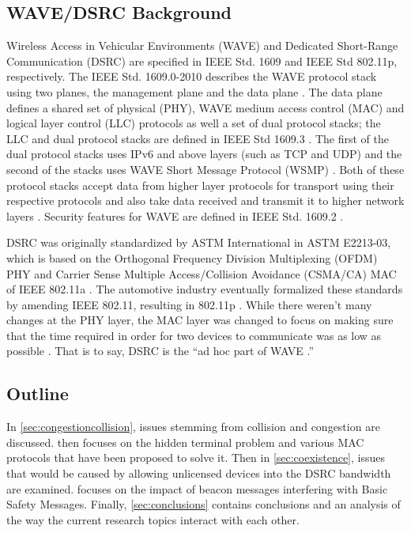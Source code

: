 \documentclass[twoside,conference]{IEEEtran}
\begin{document}
	\subsection{WAVE/DSRC Background}\label{sec:wavedsrcbackground}
		Wireless Access in Vehicular Environments (WAVE) and Dedicated Short-Range Communication (DSRC) are specified in IEEE Std. 1609 and IEEE Std 802.11p, respectively.  The IEEE Std. 1609.0-2010 describes the WAVE protocol stack using two planes, the management plane and the data plane \cite[p. 16]{IEEE2014-Std1609.0-2013}.  The data plane defines a shared set of physical (PHY), WAVE medium access control (MAC) and logical layer control (LLC) protocols as well a set of dual protocol stacks; the LLC and dual protocol stacks are defined in IEEE Std 1609.3 \cite[pp. 16--17]{IEEE2014-Std1609.0-2013}.  The first of the dual protocol stacks uses IPv6 and above layers (such as TCP and UDP) and the second of the stacks uses WAVE Short Message Protocol (WSMP) \cite[p. 9]{IEEE2010-Std1609.3-2010}.  Both of these protocol stacks accept data from higher layer protocols for transport using their respective protocols and also take data received and transmit it to higher network layers \cite[p. 9]{IEEE2010-Std1609.3-2010}.  Security features for WAVE are defined in IEEE Std. 1609.2 \cite{IEEE2013-Std1609.2-2013}.
	
		DSRC was originally standardized by ASTM International in ASTM E2213-03, which is based on the Orthogonal Frequency Division Multiplexing (OFDM) PHY and Carrier Sense Multiple Access/Collision Avoidance (CSMA/CA) MAC of IEEE 802.11a \cite[p. 10]{Lansford2013}.  The automotive industry eventually formalized these standards by amending IEEE 802.11, resulting in 802.11p \cite[p. 10]{Lansford2013}.  While there weren't many changes at the PHY layer, the MAC layer was changed to focus on making sure that the time required in order for two devices to communicate was as low as possible \cite[p. 10]{Lansford2013}\cite{Serageldin2013}.  That is to say, DSRC is the ``ad hoc part of WAVE \cite[p. 9]{Uhlemann2015}.''
	
	\subsection{Outline}\label{sec:outline}
		In \cref{sec:congestioncollision}, issues stemming from collision and congestion are discussed.  then focuses on the hidden terminal problem and various MAC protocols that have been proposed to solve it.  Then in \cref{sec:coexistence}, issues that would be caused by allowing unlicensed devices into the DSRC bandwidth are examined.   focuses on the impact of beacon messages interfering with Basic Safety Messages.  Finally, \cref{sec:conclusions} contains conclusions and an analysis of the way the current research topics interact with each other.
\end{document}
